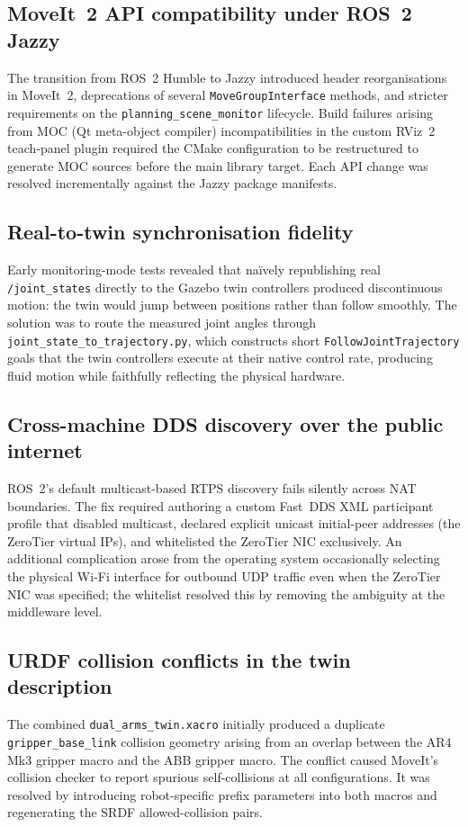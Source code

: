 \subsection{MoveIt~2 API compatibility under ROS~2 Jazzy}
The transition from ROS~2 Humble to Jazzy introduced header reorganisations in MoveIt~2,
deprecations of several \texttt{MoveGroupInterface} methods, and stricter requirements on
the \texttt{planning\_\allowbreak scene\_\allowbreak monitor} lifecycle.  Build failures arising from MOC (Qt
meta-object compiler) incompatibilities in the custom RViz~2 teach-panel plugin required the
CMake configuration to be restructured to generate MOC sources before the main library target.
Each API change was resolved incrementally against the Jazzy package manifests.

\subsection{Real-to-twin synchronisation fidelity}
Early monitoring-mode tests revealed that naïvely republishing real \texttt{/joint\_\allowbreak states}
directly to the Gazebo twin controllers produced discontinuous motion: the twin would jump
between positions rather than follow smoothly.  The solution was to route the measured joint
angles through \texttt{joint\_\allowbreak state\_\allowbreak to\_\allowbreak trajectory.py}, which constructs short
\texttt{FollowJointTrajectory} goals that the twin controllers execute at their native control
rate, producing fluid motion while faithfully reflecting the physical hardware.

\subsection{Cross-machine DDS discovery over the public internet}
ROS~2's default multicast-based RTPS discovery fails silently across NAT boundaries.  The
fix required authoring a custom Fast~DDS XML participant profile that disabled multicast,
declared explicit unicast initial-peer addresses (the ZeroTier virtual IPs), and whitelisted the
ZeroTier NIC exclusively.  An additional complication arose from the operating system
occasionally selecting the physical Wi-Fi interface for outbound UDP traffic even when the
ZeroTier NIC was specified; the whitelist resolved this by removing the ambiguity at the
middleware level.

\subsection{URDF collision conflicts in the twin description}
The combined \texttt{dual\_\allowbreak arms\_\allowbreak twin.xacro} initially produced a duplicate
\texttt{gripper\_\allowbreak base\_\allowbreak link} collision geometry arising from an overlap between the AR4 Mk3
gripper macro and the ABB gripper macro.  The conflict caused MoveIt's collision checker to
report spurious self-collisions at all configurations.  It was resolved by introducing
robot-specific prefix parameters into both macros and regenerating the SRDF allowed-collision
pairs.

